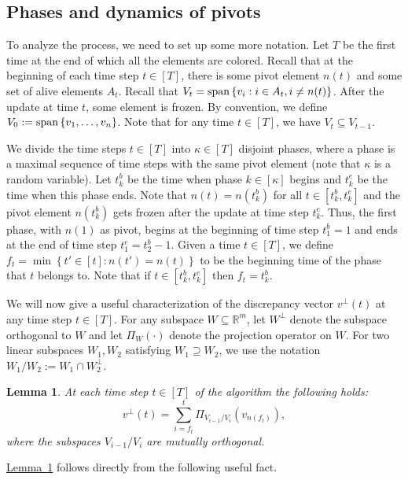 \documentclass[11pt]{article}
\numberwithin{equation}{section}
\newtheorem{lemma}[theorem]{Lemma}
\theoremstyle{definition}
\theoremstyle{plain}
\newcommand{\R}{\mathbb R}
\newcommand{\expref}[2]{\hyperref[#2]{#1~\ref{#2}}}
\newcommand{\set}[1]{\left\{ #1 \right\}}
\begin{document}
\subsection{Phases and dynamics of pivots}
To analyze the process, we need to set up some more notation. Let $T$ be the first time at the end of which all the elements are colored. Recall that at the
beginning of each time step $t \in [T]$, there is some pivot element $n(t)$ and
some set of alive elements $A_t$. Recall that $V_t = {\rm span}\set{v_i:i\in A_t, i\neq n(t)}$. After the update at time $t$, some element is frozen. By
convention, we define $V_0 := {\rm span}\set{v_1,\ldots,v_n}$. Note that for any time $t \in
[T]$, we have $V_{t} \subseteq V_{t-1}$.%


We divide the time steps $t \in [T]$ into $\kappa \in [T]$ disjoint phases,
where a phase is a maximal sequence of time steps with the same pivot element
(note that $\kappa$ is a random variable). Let $t^b_k$ be the time when phase $k
\in [\kappa]$ begins and $t^e_k$ be the time when this phase ends. Note that
$n(t)=n(t^b_k)$ for all $t \in [t^b_k,t^e_k]$ and the pivot
element $n(t^b_k)$ gets frozen after the update at time step $t^e_k$. Thus, the first
phase, with $n(1)$ as pivot, begins at the beginning of time step $t^b_1=1$ and ends at the end of time step $t^e_1=t^b_2-1$.
Given a time $t \in [T]$, we define $f_t = \min \set{t' \in [t]: n(t') = n(t)}$ to
be the beginning time of the phase that $t$ belongs to. Note that if $t \in
[t^b_k,t^e_k]$ then $f_t = t^b_k$.

We will now give a useful characterization of the discrepancy vector
$v^\perp(t)$ at any time step $t \in [T]$. For any subspace $W \subseteq \R^m$, let $W^{\perp}$ denote the subspace orthogonal to $W$ and
 let $\Pi_{W}(\cdot)$ denote the projection operator on $W$. For two linear subspaces
 $W_1,W_2$ satisfying %
 $W_1  \supseteq W_2$, we use the notation $W_1 / W_2 := W_1 \cap W_2^\perp$.

\begin{lemma}
\label{lem:perpt}
At each time step $t \in [T]$ of the algorithm the following holds:
\begin{equation}
\label{eq:perpt}
v^{\perp}(t) = \sum_{i=f_t}^{t} \Pi_{V_{i-1}/V_i}(v_{n(f_t)}),
\end{equation}
where the subspaces $V_{i-1}/V_i$ are mutually orthogonal.
\end{lemma}

\expref{Lemma}{lem:perpt} follows directly from the following useful fact.
\end{document}
